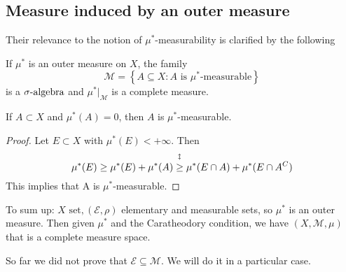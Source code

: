 \subsection{Measure induced by an outer measure}
Their relevance to the notion of \(\mu^*\)-measurability is clarified by the following
\begin{theorem}[Caratheodory]
    If \(\mu^*\) is an outer measure on \(X\), the family
    \[
        \mathcal{M} = \left\lbrace A \subseteq X : A \mbox{ is }\mu^*\mbox{-measurable}\right\rbrace
    \]
    is a \(\sigma\mbox{-algebra}\) and \(\mu^*\vert_{\mathcal{M}}\) is a complete measure.
\end{theorem}
\begin{lemma}
    If \(A \subset X\) and \(\mu^*(A) = 0\), then \(A\) is \(\mu^*\)-measurable.
\end{lemma}
\begin{proof}
    Let \(E \subset X\) with \(\mu^*(E) < +\infty\). Then 
    \[
        \mu^*(E) \geq \mu^*(E) + \mu^*(A) \overset{\symbolfootnotemark[3]{\(E \cap A^C \subseteq E\) and \(E\cap A \subseteq A\) + monotonicity}}{\geq}  \mu^*(E \cap A) + \mu^*(E \cap A^C)
    \]
    This implies that A is \(\mu^*\)-measurable.
\end{proof}
To sum up: \(X \mbox{ set}, (\mathcal{E}, \rho)\) elementary and measurable sets, so \(\mu^*\) is an outer measure. Then given \(\mu^*\) and the Caratheodory condition, we have \((X, \mathcal{M}, \mu)\) that is a complete measure space.
\begin{remark}
    So far we did not prove that \(\mathcal{E} \subseteq \mathcal{M}\). We will do it in a particular case.
\end{remark}
